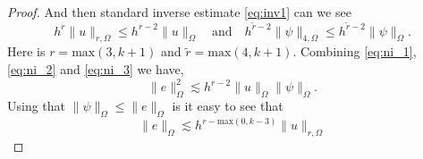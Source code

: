 \begin{proof}
        And then standard inverse estimate \eqref{eq:inv1} can we see
        \begin{equation}
            \label{eq:ni_3}
             h^{r} \| u \|_{r,\Omega  }^{  }  \le h^{r-2} \| u \|_{\Omega  }^{  } \quad  \text{and}\quad  h^{\widetilde{r} -2} \| \psi  \|_{4,\Omega  }^{  }  \le h^{\widetilde{r}-2} \| \psi  \|_{\Omega }^{  }.
        \end{equation}
        Here is $r = \mathrm{max}(3,k+1)$ and $ \widetilde{r} = \mathrm{max}(4,k+1)$.
        Combining \eqref{eq:ni_1}, \eqref{eq:ni_2} and \eqref{eq:ni_3} we have, \begin{equation}
            \| e \|_{\Omega   }^{ 2 } \lesssim  h^{r-2} \| u \|_{\Omega   }^{  } \|  \psi \|_{ \Omega  }^{  }.
        \end{equation}
        Using that $\| \psi  \|_{ \Omega  }^{  } \le \| e \|_{ \Omega   }^{  }  $ is it easy to see that \begin{equation}
            \| e \|_{\Omega   }^{  } \lesssim  h^{r- \mathrm{max}(0, k-3) } \| u \|_{r, \Omega   }^{  }
        \end{equation}

\end{proof}


